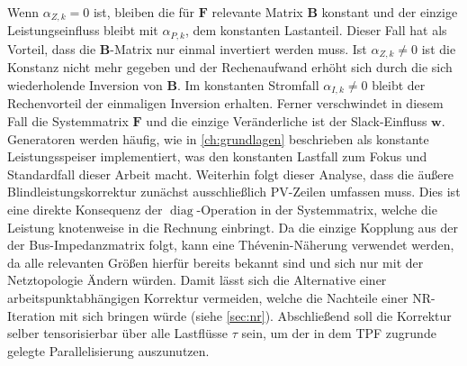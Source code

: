 Wenn $\alpha_{Z,k} = 0$ ist, bleiben die für $\mathbf{F}$ relevante Matrix $\mathbf{B}$ konstant und der einzige Leistungseinfluss bleibt mit $\alpha_{P,k}$, dem konstanten Lastanteil. Dieser Fall hat als Vorteil, dass die $\mathbf{B}$-Matrix nur einmal invertiert werden muss.
Ist $\alpha_{Z,k} \neq 0$ ist die Konstanz nicht mehr gegeben und der Rechenaufwand erhöht sich durch die sich wiederholende Inversion von $\mathbf{B}$.
Im konstanten Stromfall $\alpha_{I,k} \neq 0$ bleibt der Rechenvorteil der einmaligen Inversion erhalten. Ferner verschwindet in diesem Fall die Systemmatrix $\mathbf{F}$ und die einzige Veränderliche ist der Slack-Einfluss $\mathbf{w}$.\\

Generatoren werden häufig, wie in \cref{ch:grundlagen} beschrieben als konstante Leistungsspeiser implementiert, was den konstanten Lastfall zum Fokus und Standardfall dieser Arbeit macht. 
Weiterhin folgt dieser Analyse, dass die äußere Blindleistungskorrektur zunächst ausschließlich PV-Zeilen umfassen muss.
Dies ist eine direkte Konsequenz der $\operatorname{diag}$-Operation in der Systemmatrix, welche die Leistung knotenweise in die Rechnung einbringt.
Da die einzige Kopplung aus der der Bus-Impedanzmatrix folgt, kann eine Thévenin-Näherung verwendet werden, da alle relevanten Größen hierfür bereits bekannt sind und sich nur mit der Netztopologie Ändern würden. 
Damit lässt sich die Alternative einer arbeitspunktabhängigen Korrektur vermeiden, welche die Nachteile einer NR-Iteration mit sich bringen würde (siehe \cref{sec:nr}).
Abschließend soll die Korrektur selber tensorisierbar über alle Lastflüsse $\tau$ sein, um der in dem TPF zugrunde gelegte Parallelisierung auszunutzen.\\


